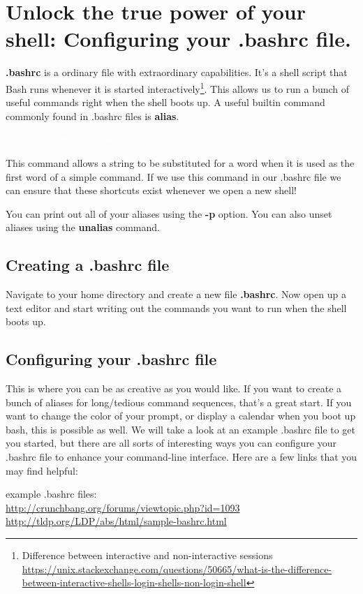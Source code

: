 \documentclass[oneside]{book}
\newcommand{\commandline}[1]{\begin{center} \colorbox{Dark}{\textcolor{white}{#1}} \end{center}}
\begin{document}
\section{Unlock the true power of your shell: Configuring your .bashrc file.}
\textbf{.bashrc} is a ordinary file with extraordinary capabilities. It's a shell script that Bash runs whenever it is started interactively\footnote{Difference between interactive and non-interactive sessions \url{https://unix.stackexchange.com/questions/50665/what-is-the-difference-between-interactive-shells-login-shells-non-login-shell}}. This allows us to run a bunch of useful commands right when the shell boots up. A useful builtin command commonly found in .bashrc files is \textbf{alias}. 
\commandline{alias [OPTIONS] \ [name[=value]...]}

This command allows a string to be substituted for a word when it is used as the first word of a simple command. If we use this command in our .bashrc file we can ensure that these shortcuts exist whenever we open a new shell! 

You can print out all of your aliases using the \textbf{-p} option. You can also unset aliases using the \textbf{unalias} command. 

\subsection{Creating a .bashrc file}
Navigate to your home directory and create a new file \textbf{.bashrc}. Now open up a text editor and start writing out the commands you want to run when the shell boots up.

\subsection{Configuring your .bashrc file}
This is where you can be as creative as you would like. If you want to create a bunch of aliases for long/tedious command sequences, that's a great start. If you want to change the color of your prompt, or display a calendar when you boot up bash, this is possible as well. We will take a look at an example .bashrc file to get you started, but there are all sorts of interesting ways you can configure your .bashrc file to enhance your command-line interface. Here are a few links that you may find helpful:

example .bashrc files:\\ \url{http://crunchbang.org/forums/viewtopic.php?id=1093}\\ 
\url{http://tldp.org/LDP/abs/html/sample-bashrc.html}
\end{document}

